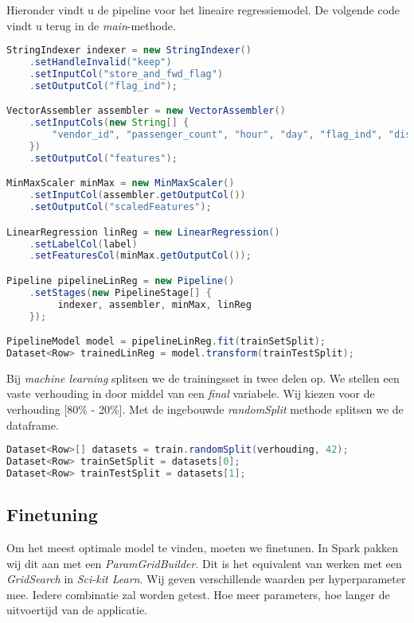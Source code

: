 \documentclass[a4paper,10pt,twoside]{report}
\begin{document}
Hieronder vindt u de pipeline voor het lineaire regressiemodel. De volgende code vindt u terug in de \textit{main}-methode.

\begin{lstlisting}[language=Java]
StringIndexer indexer = new StringIndexer()
	.setHandleInvalid("keep")
	.setInputCol("store_and_fwd_flag")
	.setOutputCol("flag_ind");

VectorAssembler assembler = new VectorAssembler()
	.setInputCols(new String[] { 
		"vendor_id", "passenger_count", "hour", "day", "flag_ind", "distance" 
	})
	.setOutputCol("features");

MinMaxScaler minMax = new MinMaxScaler()
	.setInputCol(assembler.getOutputCol())
	.setOutputCol("scaledFeatures");

LinearRegression linReg = new LinearRegression()
	.setLabelCol(label)
	.setFeaturesCol(minMax.getOutputCol());

Pipeline pipelineLinReg = new Pipeline()
	.setStages(new PipelineStage[] {
		 indexer, assembler, minMax, linReg 
	});

PipelineModel model = pipelineLinReg.fit(trainSetSplit);
Dataset<Row> trainedLinReg = model.transform(trainTestSplit);
\end{lstlisting}

Bij \textit{machine learning} splitsen we de trainingsset in twee delen op. We stellen een vaste verhouding in door middel van een \textit{final} variabele. Wij kiezen voor de verhouding [80\% - 20\%]. Met de ingebouwde \textit{randomSplit} methode splitsen we de dataframe. 

\begin{lstlisting}[language=Java]
Dataset<Row>[] datasets = train.randomSplit(verhouding, 42);
Dataset<Row> trainSetSplit = datasets[0];
Dataset<Row> trainTestSplit = datasets[1];
\end{lstlisting}

\newpage

\subsection*{Finetuning}

Om het meest optimale model te vinden, moeten we finetunen. In Spark pakken wij dit aan met een \textit{ParamGridBuilder}. Dit is het equivalent van werken met een \textit{GridSearch} in \textit{Sci-kit Learn}. Wij geven verschillende waarden per hyperparameter mee. Iedere combinatie zal worden getest. Hoe meer parameters, hoe langer de uitvoertijd van de applicatie. 
\end{document}
